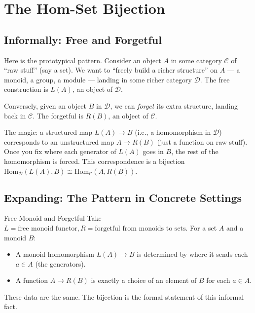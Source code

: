 \section{The Hom-Set Bijection}
\label{sec:hom-set-bijection}

\subsection{Informally: Free and Forgetful}

Here is the prototypical pattern. Consider an object $A$ in some category
$\mathcal{C}$ of ``raw stuff'' (say a set). We want to ``freely build a
richer structure'' on $A$ --- a monoid, a group, a module --- landing in
some richer category $\mathcal{D}$. The free construction is $L(A)$, an
object of $\mathcal{D}$.

Conversely, given an object $B$ in $\mathcal{D}$, we can \emph{forget} its
extra structure, landing back in $\mathcal{C}$. The forgetful is $R(B)$,
an object of $\mathcal{C}$.

The magic: a structured map $L(A) \to B$ (i.e., a homomorphism in
$\mathcal{D}$) corresponds to an unstructured map $A \to R(B)$ (just a
function on raw stuff). Once you fix where each generator of $L(A)$ goes
in $B$, the rest of the homomorphism is forced. This correspondence is a
bijection $\mathrm{Hom}_\mathcal{D}(L(A), B) \cong \mathrm{Hom}_\mathcal{C}(A, R(B))$.

\subsection{Expanding: The Pattern in Concrete Settings}

\begin{example}{Free Monoid and Forgetful}
Take $L = \text{free monoid functor}, R = \text{forgetful from monoids to
sets}$. For a set $A$ and a monoid $B$:
\begin{itemize}
  \item A monoid homomorphism $L(A) \to B$ is determined by where it
        sends each $a \in A$ (the generators).
  \item A function $A \to R(B)$ is exactly a choice of an element of $B$
        for each $a \in A$.
\end{itemize}
These data are the same. The bijection is the formal statement of this
informal fact.
\end{example}

